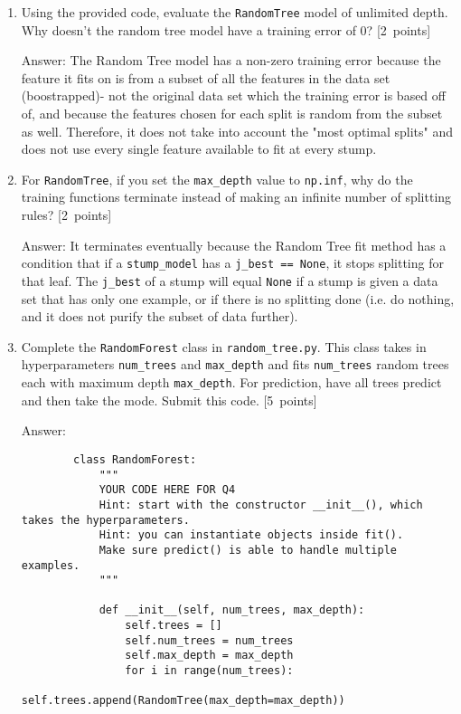 \documentclass{article}
\newcommand{\blu}[1]{{\textcolor{blu}{#1}}}
\newcommand{\gre}[1]{\textcolor{gre}{#1}}
\newcommand\ans[1]{\par\gre{Answer: #1}}
\let\ask\blu
\newcommand\pts[1]{\textcolor{pointscolour}{[#1~points]}}
\begin{document}
    \begin{enumerate}
        \item Using the provided code, evaluate the \texttt{RandomTree} model of unlimited depth. \ask{Why doesn't the random tree model have a training error of 0?} \pts{2}

        \ans{The Random Tree model has a non-zero training error because the feature it fits on is from a subset of all the features in the data set (boostrapped)- not the original data set which the training error is based off of, and because the features chosen for each split is random from the subset as well. Therefore, it does not take into account the "most optimal splits" and does not use every single feature available to fit at every stump.}
        
        \item For \texttt{RandomTree}, if you set the \texttt{max\_depth} value to \texttt{np.inf}, \ask{why do the training functions terminate instead of making an infinite number of splitting rules?} \pts{2}

        \ans{It terminates eventually because the Random Tree fit method has a condition that if a \texttt{stump\_model} has a \texttt{j\_best == None}, it stops splitting for that leaf. The \texttt{j\_best} of a stump will equal \texttt{None} if a stump is given a data set that has only one example, or if there is no splitting done (i.e. do nothing, and it does not purify the subset of data further).}
        \newpage
        
        \item Complete the \texttt{RandomForest} class in \texttt{random\string_tree.py}. This class takes in hyperparameters \texttt{num\string_trees} and \texttt{max\string_depth} and
        fits \texttt{num\string_trees} random trees each with maximum depth \texttt{max\string_depth}. For prediction, have all trees predict and then take the mode. \ask{Submit this code.} \pts{5}
        \ans{}
        \begin{verbatim}
        class RandomForest:
            """
            YOUR CODE HERE FOR Q4
            Hint: start with the constructor __init__(), which takes the hyperparameters.
            Hint: you can instantiate objects inside fit().
            Make sure predict() is able to handle multiple examples.
            """
        
            def __init__(self, num_trees, max_depth):
                self.trees = []
                self.num_trees = num_trees
                self.max_depth = max_depth
                for i in range(num_trees):
                    self.trees.append(RandomTree(max_depth=max_depth))
        

\end{verbatim}
\end{enumerate}
\end{document}

